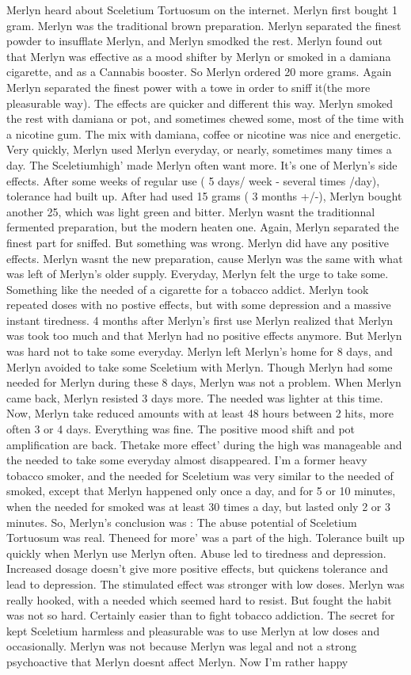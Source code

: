 \documentclass[12pt]{book}
\begin{document}
Merlyn heard about Sceletium Tortuosum on the internet. Merlyn first bought 1 gram. Merlyn was the traditional brown preparation. Merlyn separated the finest powder to insufflate Merlyn, and Merlyn smodked the rest. Merlyn found out that Merlyn was effective as a mood shifter by Merlyn or smoked in a damiana cigarette, and as a Cannabis booster. So Merlyn ordered 20 more grams. Again Merlyn separated the finest power with a towe in order to sniff it(the more pleasurable way). The effects are quicker and different this way. Merlyn smoked the rest with damiana or pot, and sometimes chewed some, most of the time with a nicotine gum. The mix with damiana, coffee or nicotine was nice and energetic. Very quickly, Merlyn used Merlyn everyday, or nearly, sometimes many times a day. The Sceletiumhigh' made Merlyn often want more. It's one of Merlyn's side effects. After some weeks of regular use ( 5 days/ week - several times /day), tolerance had built up. After had used 15 grams ( 3 months +/-), Merlyn bought another 25, which was light green and bitter. Merlyn wasnt the traditionnal fermented preparation, but the modern heaten one. Again, Merlyn separated the finest part for sniffed. But something was wrong. Merlyn did have any positive effects. Merlyn wasnt the new preparation, cause Merlyn was the same with what was left of Merlyn's older supply. Everyday, Merlyn felt the urge to take some. Something like the needed of a cigarette for a tobacco addict. Merlyn took repeated doses with no postive effects, but with some depression and a massive instant tiredness. 4 months after Merlyn's first use Merlyn realized that Merlyn was took too much and that Merlyn had no positive effects anymore. But Merlyn was hard not to take some everyday. Merlyn left Merlyn's home for 8 days, and Merlyn avoided to take some Sceletium with Merlyn. Though Merlyn had some needed for Merlyn during these 8 days, Merlyn was not a problem. When Merlyn came back, Merlyn resisted 3 days more. The needed was lighter at this time. Now, Merlyn take reduced amounts with at least 48 hours between 2 hits, more often 3 or 4 days. Everything was fine. The positive mood shift and pot amplification are back. Thetake more effect' during the high was manageable and the needed to take some everyday almost disappeared. I'm a former heavy tobacco smoker, and the needed for Sceletium was very similar to the needed of smoked, except that Merlyn happened only once a day, and for 5 or 10 minutes, when the needed for smoked was at least 30 times a day, but lasted only 2 or 3 minutes. So, Merlyn's conclusion was : The abuse potential of Sceletium Tortuosum was real. Theneed for more' was a part of the high. Tolerance built up quickly when Merlyn use Merlyn often. Abuse led to tiredness and depression. Increased dosage doesn't give more positive effects, but quickens tolerance and lead to depression. The stimulated effect was stronger with low doses. Merlyn was really hooked, with a needed which seemed hard to resist. But fought the habit was not so hard. Certainly easier than to fight tobacco addiction. The secret for kept Sceletium harmless and pleasurable was to use Merlyn at low doses and occasionally. Merlyn was not because Merlyn was legal and not a strong psychoactive that Merlyn doesnt affect Merlyn. Now I'm rather happy 
\end{document}
